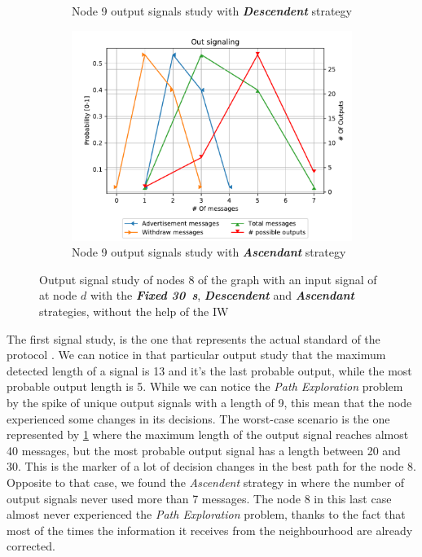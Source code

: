 \begin{figure}[ht]
\begin{subfigure}[b]{0.32\textwidth}
		 \caption{Node \num{9} output signals study with \textbf{\textit{Descendent}} strategy}
         \label{fig:signal_node9_fabrikant_descendent_noiw}
     \end{subfigure}
     \hfill
     \begin{subfigure}[b]{0.32\textwidth}
         \centering
         \includegraphics[width=\textwidth]{images/signal_study/fabrikant/Ascending.pdf}
		 \caption{Node \num{9} output signals study with \textbf{\textit{Ascendant}} strategy}
         \label{fig:signal_node9_fabrikant_ascendent_noIW}
     \end{subfigure}
		\caption{Output signal study of nodes \num{8} of the graph 
			 with an input signal of  at node $d$
			with the \textbf{\textit{Fixed \SI{30}{\second}}}, \textbf{\textit{Descendent}}
			and \textbf{\textit{Ascendant}}	strategies, without the help of the \ac{IW}}
        \label{fig:signal_fabrikant}
\end{figure}

The first signal study,  is the
one that represents the actual standard of the protocol \cite{rfc4271}.
We can notice in that particular output study that the maximum detected length of
a signal is \num{13} and it's the last probable output, while the most probable
output length is \num{5}.
While we can notice the \textit{Path Exploration} problem by the spike of unique
output signals with a length of \num{9}, this mean that the node experienced some
changes in its decisions.
The worst-case scenario is the one represented by \cref{fig:signal_node9_fabrikant_descendent_noiw}
where the maximum length of the output signal reaches almost \num{40} messages, but
the most probable output signal has a length between \num{20} and \num{30}.
This is the marker of a lot of decision changes in the best path for the node \num{8}.
Opposite to that case, we found the \textit{Ascendent} strategy in 
 where the number of output
signals never used more than \num{7} messages.
The node \num{8} in this last case almost never experienced the \textit{Path Exploration}
problem, thanks to the fact that most of the times the information it receives
from the neighbourhood are already corrected.

